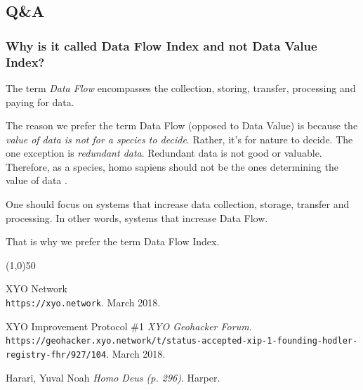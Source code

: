 \documentclass{article}
\begin{document}
\subsection{Q\&A}

\subsubsection{Why is it called Data Flow Index and not Data Value Index?}

The term \textit{Data Flow} encompasses the collection, storing, transfer, processing and paying for data. 

The reason we prefer the term Data Flow (opposed to Data Value) is because the \textit{value of data is not for a species to decide}. Rather, it's for nature to decide. The one exception is \textit{redundant data}. Redundant data is not good or valuable. Therefore, as a species, homo sapiens should not be the ones determining the value of data \cite{homo-deus-narrative}. 

One should focus on systems that increase data collection, storage, transfer and processing. In other words, systems that increase Data Flow. 

That is why we prefer the term Data Flow Index.


\begin{center}
\line(1,0){50}
\end{center}

\begin{thebibliography}{9}

XYO Network
\\\texttt{https://xyo.network}.
March 2018.

XYO Improvement Protocol \#1
\textit{XYO Geohacker Forum}.
\\\texttt{https://geohacker.xyo.network/t/status-accepted-xip-1-founding-hodler-registry-fhr/927/104}.
March 2018.

Harari, Yuval Noah
\textit{Homo Deus (p. 296)}. 
Harper.


\end{thebibliography}

\end{document}
